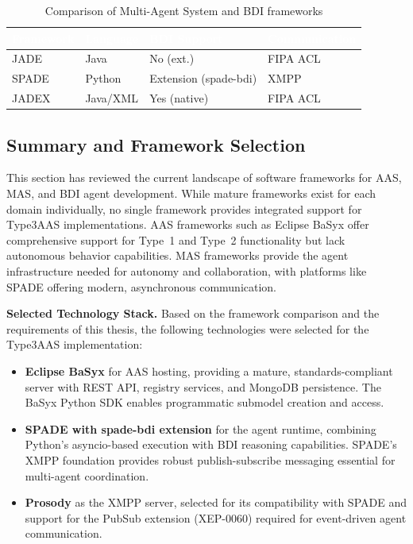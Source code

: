 
\begin{table}[p]
\centering
\caption{Comparison of Multi-Agent System and BDI frameworks}
\label{tab:mas_framework_comparison}
\begin{tabular}{>{\raggedright}p{3cm} >{\centering}p{2.5cm} >{\centering}p{2.5cm} >{\centering\arraybackslash}p{4cm}}
\toprule
\rowcolor{headerblue}
\textcolor{white}{Framework} & \textcolor{white}{Language} & \textcolor{white}{BDI Support} & \textcolor{white}{Communication} \\
\midrule
JADE & Java & No (ext.) & FIPA \ac{ACL} \\
\rowcolor{lightgray}
SPADE & Python & Extension (spade-bdi) & \ac{XMPP} \\
JADEX & Java/\ac{XML} & Yes (native) & FIPA \ac{ACL} \\
\bottomrule
\end{tabular}
\end{table}
\subsection{Summary and Framework Selection}
\label{subsec:frameworks_summary}

This section has reviewed the current landscape of software frameworks for \ac{AAS}, \ac{MAS}, and \ac{BDI} agent development. While mature frameworks exist for each domain individually, no single framework provides integrated support for \ac{Type3AAS} implementations. \ac{AAS} frameworks such as Eclipse BaSyx offer comprehensive support for Type~1 and Type~2 functionality but lack autonomous behavior capabilities. \ac{MAS} frameworks provide the agent infrastructure needed for autonomy and collaboration, with platforms like SPADE offering modern, asynchronous communication.

\textbf{Selected Technology Stack.} Based on the framework comparison and the requirements of this thesis, the following technologies were selected for the \ac{Type3AAS} implementation:

\begin{itemize}
    \item \textbf{Eclipse BaSyx} for \ac{AAS} hosting, providing a mature, standards-compliant server with REST API, registry services, and MongoDB persistence. The BaSyx Python SDK enables programmatic submodel creation and access.
    
    \item \textbf{SPADE with spade-bdi extension} for the agent runtime, combining Python's asyncio-based execution with \ac{BDI} reasoning capabilities. SPADE's \ac{XMPP} foundation provides robust publish-subscribe messaging essential for multi-agent coordination.
    
    \item \textbf{Prosody} as the \ac{XMPP} server, selected for its compatibility with SPADE and support for the PubSub extension (XEP-0060) required for event-driven agent communication.
\end{itemize}

